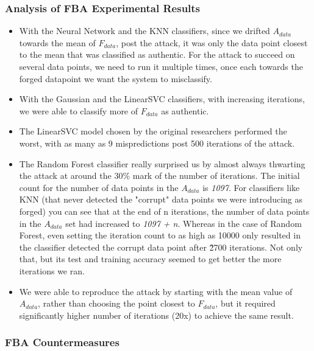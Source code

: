 \documentclass{article}
\begin{document}
\subsubsection{Analysis of FBA Experimental Results}

\begin{itemize}
\item With the Neural Network and the KNN classifiers, since we drifted $A_{data}$ towards the mean of $F_{data}$, post the attack, it was only the data point closest to the mean that was classified as authentic. For the attack to succeed on several data points, we need to run it multiple times, once each towards the forged datapoint we want the system to misclassify.
\item With the Gaussian and the LinearSVC classifiers, with increasing iterations, we were able to classify more of $F_{data}$ as authentic. 
\item The LinearSVC model chosen by the original researchers performed the worst, with as many as 9 mispredictions post 500 iterations of the attack.
\item The Random Forest classifier really surprised us by almost always thwarting the attack at around the 30\% mark of the number of iterations. The initial count for the number of data points in the $A_{data}$ is \textit{1097}. For classifiers like KNN (that never detected the "corrupt" data points we were introducing as forged) you can see that at the end of n iterations, the number of data points in the $A_{data}$ set had increased to \textit{1097 + n}. Whereas in the case of Random Forest, even setting the iteration count to as high as 10000 only resulted in the classifier detected the corrupt data point after \~2700 iterations. Not only that, but its test and training accuracy seemed to get better the more iterations we ran.
\item We were able to reproduce the attack by starting with the mean value of $A_{data}$, rather than choosing the point closest to $F_{data}$, but it required significantly higher number of iterations (20x) to achieve the same result.
\end{itemize}

\subsubsection{FBA Countermeasures}
\end{document}
